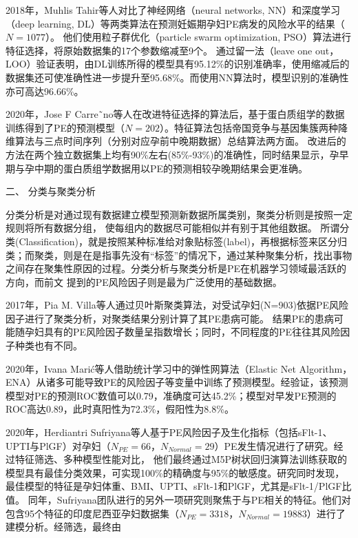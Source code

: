 2018年，Muhlis Tahir等人\cite{Tahir2018,Tahir2018-2}对比了神经网络（neural networks, NN）和深度学习（deep learning, DL）等两类算法在预测妊娠期孕妇PE病发的风险水平的结果（$N=1077$）。
他们使用粒子群优化（particle swarm optimization, PSO）算法进行特征选择，将原始数据集的17个参数缩减至9个。
通过留一法（leave one out，LOO）验证表明，由DL训练所得的模型具有95.12\%的识别准确率，使用缩减后的数据集还可使准确性进一步提升至95.68\%。而使用NN算法时，模型识别的准确性亦可高达96.66\%。

2020年，Jose F Carre˜no等人\cite{Carreno2020}在改进特征选择的算法后，基于蛋白质组学的数据训练得到了PE的预测模型（$N=202$）。特征算法包括帝国竞争与基因集簇两种降维算法与三点时间序列（分别对应孕前中晚期数据）总结算法两方面。
改进后的方法在两个独立数据集上均有90\%左右(85\%-93\%)的准确性，同时结果显示，孕早期与孕中期的蛋白质组学数据用以PE的预测相较孕晚期结果会更准确。

二、 分类与聚类分析

分类分析是对通过现有数据建立模型预测新数据所属类别，聚类分析则是按照一定规则将所有数据分组，
使每组内的数据尽可能相似并有别于其他组数据\cite{Han2006}。
所谓分类(Classification)，就是按照某种标准给对象贴标签(label)，再根据标签来区分归类；而聚类，则是在是指事先没有“标签”的情况下，通过某种聚集分析，找出事物之间存在聚集性原因的过程。分类分析与聚类分析是PE在机器学习领域最活跃的方向，而前文
提到的PE风险因子则是最为广泛使用的基础数据。

2017年，Pia M. Villa等人\cite{Villa2017}通过贝叶斯聚类算法，对受试孕妇(N=903)依据PE风险因子进行了聚类分析，对聚类结果分别计算了其PE患病可能。
结果PE的患病可能随孕妇具有的PE风险因子数量呈指数增长；同时，不同程度的PE往往其风险因子种类也有不同。

2020年，Ivana Mari{\'{c}}\cite{Maric2020}等人借助统计学习中的弹性网算法（Elastic Net Algorithm，ENA）从诸多可能导致PE的风险因子等变量中训练了预测模型。经验证，该预测模型对PE的预测ROC数值可以0.79，准确度可达45.2\%；模型对早发PE预测的
ROC高达0.89，此时真阳性为72.3\%，假阳性为8.8\%。

2020年，Herdiantri Sufriyana等人\cite{Sufriyana2020-1}基于PE风险因子及生化指标（包括sFlt-1、UPTI与PlGF）对孕妇（$N_{PE}=66$，$N_{Normal}=29$）PE发生情况进行了研究。经过特征筛选、多种模型性能对比，
他们最终通过M5P树状回归演算法训练获取的模型具有最佳分类效果，可实现100\%的精确度与95\%的敏感度。研究同时发现，最佳模型的特征是孕妇体重、BMI、UPTI、sFlt-1和PlGF，尤其是sFlt-1/PlGF比值。
同年，Sufriyana团队进行的另外一项研究\cite{Sufriyana2020}则聚焦于与PE相关的特征。他们对包含95个特征的印度尼西亚孕妇数据集（$N_{PE}=3318$，$N_{Normal}=19883$）进行了建模分析。经筛选，最终由

